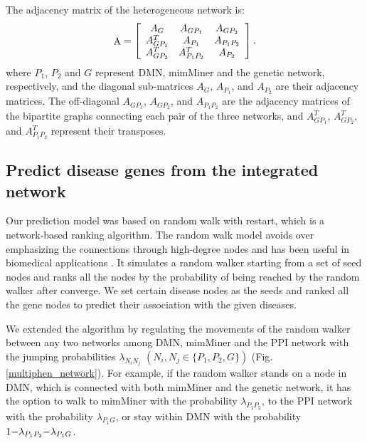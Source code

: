 The adjacency matrix of the heterogeneous network is:
\begin{equation}\label{adj}
{\mathop{\rm A}\nolimits}  = \left[ {\begin{array}{*{20}{c}}
{{A_G}}&{{A_{G{P_1}}}}&{{A_{G{P_2}}}}\\
{A_{G{P_1}}^T}&{{A_{{P_1}}}}&{{A_{{P_1}{P_2}}}}\\
{A_{G{P_2}}^T}&{A_{{P_1}{P_2}}^T}&{{A_{{P_2}}}}
\end{array}} \right],
\end{equation}
where $P_1$, $P_2$ and $G$ represent DMN, mimMiner
and the genetic network, respectively, and the diagonal sub-matrices
$A_G$, $A_{P_1}$, and $A_{P_2}$ are their adjacency matrices.
The off-diagonal $A_{GP_1}$, $A_{GP_2}$, and $A_{P_1P_2}$ are the
adjacency matrices of the bipartite graphs connecting each
pair of the three networks, and $A^T_{GP_1}$, $A^T_{GP_2}$,
and $A^T_{P_1P_2}$ represent their transposes.



\subsection{Predict disease genes from the integrated network}
Our prediction model was based on random walk with restart,
which is a network-based ranking algorithm.
The random walk model avoids over emphasizing the connections
through high-degree nodes and has been useful in biomedical
applications \cite{kohler2008walking,li2010genome,berger2010systems}.
It simulates a random walker starting from a set of seed nodes
and ranks all the nodes by the probability of being reached
by the random walker after converge.
We set certain disease nodes as the seeds and ranked all the gene nodes
to predict their association with the given diseases.

We extended the algorithm by regulating the movements of
the random walker between any two networks among DMN, mimMiner
and the PPI network with the
jumping probabilities ${\lambda _{{N_i}{N_j}}}$
$({N_i},{N_j} \in \{ {P_1},{P_2},G\} )$ (Fig.\ref{multiphen_network}).
For example, if the random walker stands on a node in DMN,
which is connected with both mimMiner and the genetic network,
it has the option to walk to mimMiner with the probability ${\lambda _{{P_1}{P_2}}}$,
to the PPI network with the probability ${\lambda _{P_1G}}$,
or stay within DMN with the probability ${\rm{1 - }}{\lambda _{{P_1}{P_2}}}{\rm{ - }}{\lambda _{{P_1}G}}$.


